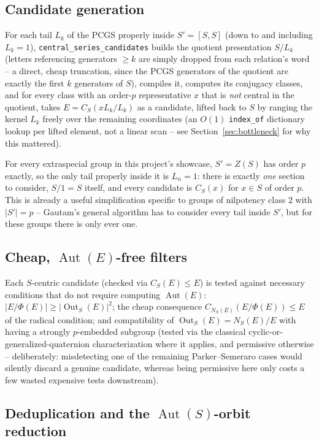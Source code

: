 \documentclass[11pt]{article}
\theoremstyle{remark}
\begin{document}
\subsection{Candidate generation}

For each tail $L_k$ of the PCGS properly inside $S' = [S,S]$ (down to and
including $L_k=1$), \texttt{central\_series\_candidates} builds the quotient
presentation $S/L_k$ (letters referencing generators $\ge k$ are simply
dropped from each relation's word -- a direct, cheap truncation, since the
PCGS generators of the quotient are exactly the first $k$ generators of
$S$), compiles it, computes its conjugacy classes, and for every class with
an order-$p$ representative $x$ that is \emph{not} central in the quotient,
takes $E = C_S(xL_k/L_k)$ as a candidate, lifted back to $S$ by ranging the
kernel $L_k$ freely over the remaining coordinates (an $O(1)$
\texttt{index\_of} dictionary lookup per lifted element, not a linear scan --
see Section~\ref{sec:bottleneck} for why this mattered).

For every extraspecial group in this project's showcase, $S' = Z(S)$ has
order $p$ exactly, so the only tail properly inside it is $L_n = 1$: there
is exactly \emph{one} section to consider, $S/1 = S$ itself, and every
candidate is $C_S(x)$ for $x \in S$ of order $p$. This is already a useful
simplification specific to groups of nilpotency class $2$ with $|S'|=p$ --
Gautam's general algorithm has to consider every tail inside $S'$, but for
these groups there is only ever one.

\subsection{Cheap, $\operatorname{Aut}(E)$-free filters}

Each $S$-centric candidate (checked via $C_S(E) \le E$) is tested against
necessary conditions that do not require computing $\operatorname{Aut}(E)$:
$|E/\Phi(E)| \ge |\operatorname{Out}_S(E)|^2$; the cheap consequence
$C_{N_S(E)}(E/\Phi(E)) \le E$ of the radical condition; and compatibility of
$\operatorname{Out}_S(E) = N_S(E)/E$ with having a strongly $p$-embedded
subgroup (tested via the classical cyclic-or-generalized-quaternion
characterization where it applies, and permissive otherwise --
deliberately: misdetecting one of the remaining Parker--Semeraro cases
would silently discard a genuine candidate, whereas being permissive here
only costs a few wasted expensive tests downstream).

\subsection{Deduplication and the $\operatorname{Aut}(S)$-orbit reduction}
\end{document}

